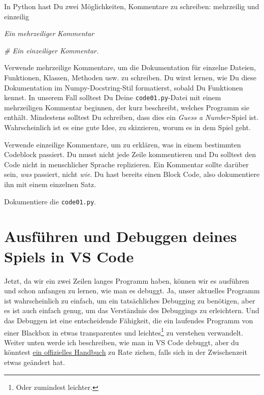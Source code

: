 \documentclass[
]{book}
\newenvironment{Shaded}{\begin{snugshade}}{\end{snugshade}}
\newcommand{\CommentTok}[1]{\textcolor[rgb]{0.56,0.35,0.01}{\textit{#1}}}
\begin{document}
In Python hast Du zwei Möglichkeiten, Kommentare zu schreiben: mehrzeilig und einzeilig

\begin{Shaded}
\begin{Highlighting}[]
\CommentTok{\textquotesingle{}\textquotesingle{}\textquotesingle{}Ein }
\CommentTok{mehrzeiliger }
\CommentTok{Kommentar}
\CommentTok{\textquotesingle{}\textquotesingle{}\textquotesingle{}}

\CommentTok{\#  Ein einzeiliger Kommentar.}
\end{Highlighting}
\end{Shaded}

Verwende mehrzeilige Kommentare, um die Dokumentation für einzelne Dateien, Funktionen, Klassen, Methoden usw. zu schreiben. Du wirst lernen, wie Du diese Dokumentation im Numpy-Docstring-Stil formatierst, sobald Du Funktionen kennst. In unserem Fall solltest Du Deine \texttt{code01.py}-Datei mit einem mehrzeiligen Kommentar beginnen, der kurz beschreibt, welches Programm sie enthält. Mindestens solltest Du schreiben, dass dies ein \emph{Guess a Number}-Spiel ist. Wahrscheinlich ist es eine gute Idee, zu skizzieren, worum es in dem Spiel geht.

Verwende einzeilige Kommentare, um zu erklären, was in einem bestimmten Codeblock passiert. Du musst nicht jede Zeile kommentieren und Du solltest den Code nicht in menschlicher Sprache replizieren. Ein Kommentar sollte darüber sein, \emph{was} passiert, nicht \emph{wie}. Du hast bereits einen Block Code, also dokumentiere ihn mit einem einzelnen Satz.

Dokumentiere die \texttt{code01.py}.

\hypertarget{debugging}{%
\section{Ausführen und Debuggen deines Spiels in VS Code}\label{debugging}}

Jetzt, da wir ein zwei Zeilen langes Programm haben, können wir es ausführen und schon anfangen zu lernen, wie man es debuggt. Ja, unser aktuelles Programm ist wahrscheinlich zu einfach, um ein tatsächliches Debugging zu benötigen, aber es ist auch einfach genug, um das Verständnis des Debuggings zu erleichtern. Und das Debuggen ist eine entscheidende Fähigkeit, die ein laufendes Programm von einer Blackbox in etwas transparentes und leichtes\footnote{Oder zumindest leichter.} zu verstehen verwandelt. Weiter unten werde ich beschreiben, wie man in VS Code debuggt, aber du könntest \href{https://code.visualstudio.com/docs/python/debugging}{ein offizielles Handbuch} zu Rate ziehen, falls sich in der Zwischenzeit etwas geändert hat.
\end{document}
